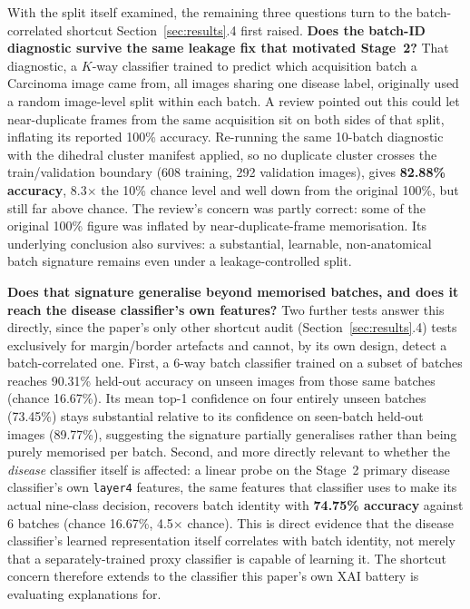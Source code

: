 With the split itself examined, the remaining three questions turn to the batch-correlated shortcut Section~\ref{sec:results}.4 first raised. \textbf{Does the batch-ID diagnostic survive the same leakage fix that motivated Stage~2?} That diagnostic, a $K$-way classifier trained to predict which acquisition batch a Carcinoma image came from, all images sharing one disease label, originally used a random image-level split within each batch. A review pointed out this could let near-duplicate frames from the same acquisition sit on both sides of that split, inflating its reported 100\% accuracy. Re-running the same 10-batch diagnostic with the dihedral cluster manifest applied, so no duplicate cluster crosses the train/validation boundary (608 training, 292 validation images), gives \textbf{82.88\% accuracy}, 8.3$\times$ the 10\% chance level and well down from the original 100\%, but still far above chance. The review's concern was partly correct: some of the original 100\% figure was inflated by near-duplicate-frame memorisation. Its underlying conclusion also survives: a substantial, learnable, non-anatomical batch signature remains even under a leakage-controlled split.

\textbf{Does that signature generalise beyond memorised batches, and does it reach the disease classifier's own features?} Two further tests answer this directly, since the paper's only other shortcut audit (Section~\ref{sec:results}.4) tests exclusively for margin/border artefacts and cannot, by its own design, detect a batch-correlated one. First, a 6-way batch classifier trained on a subset of batches reaches 90.31\% held-out accuracy on unseen images from those same batches (chance 16.67\%). Its mean top-1 confidence on four entirely unseen batches (73.45\%) stays substantial relative to its confidence on seen-batch held-out images (89.77\%), suggesting the signature partially generalises rather than being purely memorised per batch. Second, and more directly relevant to whether the \textit{disease} classifier itself is affected: a linear probe on the Stage~2 primary disease classifier's own \texttt{layer4} features, the same features that classifier uses to make its actual nine-class decision, recovers batch identity with \textbf{74.75\% accuracy} against 6 batches (chance 16.67\%, 4.5$\times$ chance). This is direct evidence that the disease classifier's learned representation itself correlates with batch identity, not merely that a separately-trained proxy classifier is capable of learning it. The shortcut concern therefore extends to the classifier this paper's own XAI battery is evaluating explanations for.

